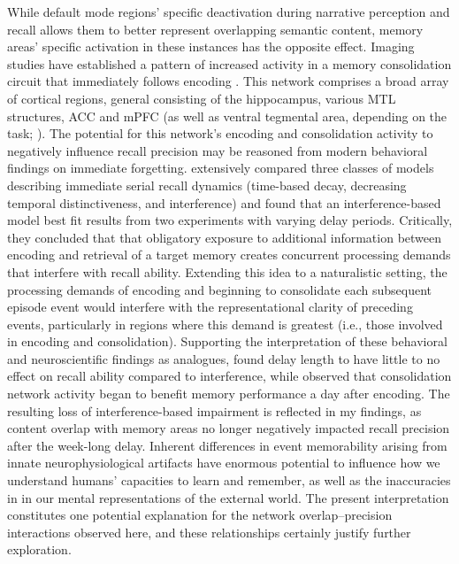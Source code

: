 \documentclass{article}
\begin{document}
While default mode regions' specific deactivation during narrative perception and recall allows them to better represent overlapping semantic content, memory areas' specific activation in these instances has the opposite effect.  Imaging studies have established a pattern of increased activity in a memory consolidation circuit that immediately follows encoding \citep{TambEtal10, TambDava13, TompDava17}.  This network comprises a broad array of cortical regions, general consisting of the hippocampus, various MTL structures, ACC and mPFC (as well as ventral tegmental area, depending on the task; \citealp{NazaReza13, TompEtal15, KitaEtal17, CastEtal19}).  The potential for this network's encoding and consolidation activity to negatively influence recall precision may be reasoned from modern behavioral findings on immediate forgetting.  \cite{OberLewa08} extensively compared three classes of models describing immediate serial recall dynamics (time-based decay, decreasing temporal distinctiveness, and interference) and found that an interference-based model best fit results from two experiments with varying delay periods.  Critically, they concluded that that obligatory exposure to additional information between encoding and retrieval of a target memory creates concurrent processing demands that interfere with recall ability.  Extending this idea to a naturalistic setting, the processing demands of encoding and beginning to consolidate each subsequent episode event would interfere with the representational clarity of preceding events, particularly in regions where this demand is greatest (i.e., those involved in encoding and consolidation).  Supporting the interpretation of these behavioral and neuroscientific findings as analogues, \cite{OberLewa08} found delay length to have little to no effect on recall ability compared to interference, while \cite{TompEtal15} observed that consolidation network activity began to benefit memory performance a day after encoding.  The resulting loss of interference-based impairment is reflected in my findings, as content overlap with memory areas no longer negatively impacted recall precision after the week-long delay.  Inherent differences in event memorability arising from innate neurophysiological artifacts have enormous potential to influence how we understand humans' capacities to learn and remember, as well as the inaccuracies in in our mental representations of the external world.  The present interpretation constitutes one potential explanation for the network overlap–precision interactions observed here, and these relationships certainly justify further exploration.  
\end{document}
